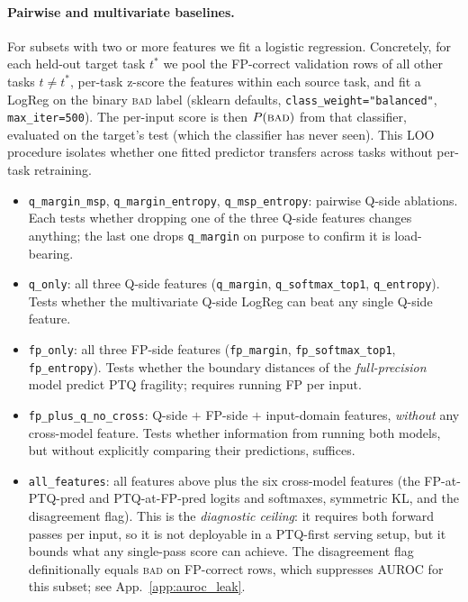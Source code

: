 \documentclass{article}
\newcommand{\fp}{\textsc{FP}\xspace}
\newcommand{\ptq}{\textsc{PTQ}\xspace}
\newcommand{\bad}{\textsc{bad}\xspace}
\begin{document}
\paragraph{Pairwise and multivariate baselines.}
For subsets with two or more features we fit a logistic regression. Concretely, for each held-out target task $t^\ast$ we pool the \fp{}-correct validation rows of all other tasks $t \neq t^\ast$, per-task z-score the features within each source task, and fit a LogReg on the binary \bad{} label (sklearn defaults, \texttt{class\_weight="balanced"}, \texttt{max\_iter=500}). The per-input score is then $P(\bad)$ from that classifier, evaluated on the target's test (which the classifier has never seen). This LOO procedure isolates whether one fitted predictor transfers across tasks without per-task retraining.
\begin{itemize}[leftmargin=*,topsep=2pt,itemsep=0pt]
\item \texttt{q\_margin\_msp}, \texttt{q\_margin\_entropy}, \texttt{q\_msp\_entropy}: pairwise Q-side ablations. Each tests whether dropping one of the three Q-side features changes anything; the last one drops \texttt{q\_margin} on purpose to confirm it is load-bearing.
\item \texttt{q\_only}: all three Q-side features (\texttt{q\_margin}, \texttt{q\_softmax\_top1}, \texttt{q\_entropy}). Tests whether the multivariate Q-side LogReg can beat any single Q-side feature.
\item \texttt{fp\_only}: all three FP-side features (\texttt{fp\_margin}, \texttt{fp\_softmax\_top1}, \texttt{fp\_entropy}). Tests whether the boundary distances of the \emph{full-precision} model predict \ptq{} fragility; requires running \fp{} per input.
\item \texttt{fp\_plus\_q\_no\_cross}: Q-side $+$ FP-side $+$ input-domain features, \emph{without} any cross-model feature. Tests whether information from running both models, but without explicitly comparing their predictions, suffices.
\item \texttt{all\_features}: all features above plus the six cross-model features (the FP-at-PTQ-pred and PTQ-at-FP-pred logits and softmaxes, symmetric KL, and the disagreement flag). This is the \emph{diagnostic ceiling}: it requires both forward passes per input, so it is not deployable in a \ptq{}-first serving setup, but it bounds what any single-pass score can achieve. The disagreement flag definitionally equals \bad{} on \fp{}-correct rows, which suppresses AUROC for this subset; see App.~\ref{app:auroc_leak}.
\end{itemize}
\end{document}
